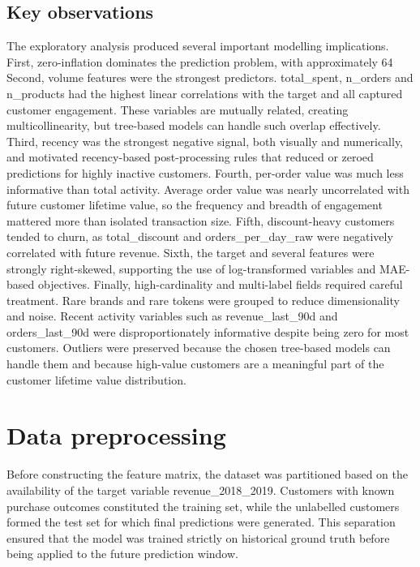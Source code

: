 \subsection{Key observations}
The exploratory analysis produced several important modelling implications. First, zero-inflation dominates the prediction problem, with approximately 64%
Second, volume features were the strongest predictors. total\_spent, n\_orders and n\_products had the highest linear correlations with the target and all captured customer engagement. These variables are mutually related, creating multicollinearity, but tree-based models can handle such overlap effectively. Third, recency was the strongest negative signal, both visually and numerically, and motivated recency-based post-processing rules that reduced or zeroed predictions for highly inactive customers.
Fourth, per-order value was much less informative than total activity. Average order value was nearly uncorrelated with future customer lifetime value, so the frequency and breadth of engagement mattered more than isolated transaction size. Fifth, discount-heavy customers tended to churn, as total\_discount and orders\_per\_day\_raw were negatively correlated with future revenue. Sixth, the target and several features were strongly right-skewed, supporting the use of log-transformed variables and MAE-based objectives.
Finally, high-cardinality and multi-label fields required careful treatment. Rare brands and rare tokens were grouped to reduce dimensionality and noise. Recent activity variables such as revenue\_last\_90d and orders\_last\_90d were disproportionately informative despite being zero for most customers. Outliers were preserved because the chosen tree-based models can handle them and because high-value customers are a meaningful part of the customer lifetime value distribution.

\section{Data preprocessing}
Before constructing the feature matrix, the dataset was partitioned based on the availability of the target variable revenue\_2018\_2019. Customers with known purchase outcomes constituted the training set, while the unlabelled customers formed the test set for which final predictions were generated. This separation ensured that the model was trained strictly on historical ground truth before being applied to the future prediction window.

